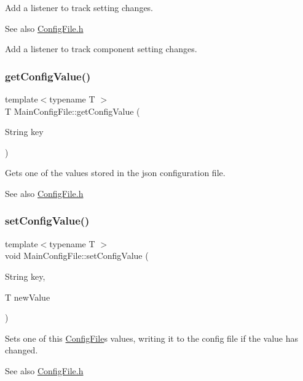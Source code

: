 Add a listener to track setting changes. \begin{DoxySeeAlso}{See also}
\mbox{\hyperlink{ConfigFile_8h}{Config\+File.\+h}}
\end{DoxySeeAlso}
Add a listener to track component setting changes. \mbox{\label{classMainConfigFile_ab856604112ebd4364fba1a2bbe3755ed}} 
\subsubsection{\texorpdfstring{get\+Config\+Value()}{getConfigValue()}}
{\footnotesize\ttfamily template$<$typename T $>$ \\
T Main\+Config\+File\+::get\+Config\+Value (\begin{DoxyParamCaption}\item[{String}]{key }\end{DoxyParamCaption})\hspace{0.3cm}{\ttfamily [inline]}}

Gets one of the values stored in the json configuration file. \begin{DoxySeeAlso}{See also}
\mbox{\hyperlink{ConfigFile_8h}{Config\+File.\+h}} 
\end{DoxySeeAlso}
\mbox{\label{classMainConfigFile_a17371ce4c90e5e4ae04a5adbeae6428e}} 
\subsubsection{\texorpdfstring{set\+Config\+Value()}{setConfigValue()}}
{\footnotesize\ttfamily template$<$typename T $>$ \\
void Main\+Config\+File\+::set\+Config\+Value (\begin{DoxyParamCaption}\item[{String}]{key,  }\item[{T}]{new\+Value }\end{DoxyParamCaption})\hspace{0.3cm}{\ttfamily [inline]}}

Sets one of this \mbox{\hyperlink{classConfigFile}{Config\+File}}\textquotesingle{}s values, writing it to the config file if the value has changed. ~\newline
\begin{DoxySeeAlso}{See also}
\mbox{\hyperlink{ConfigFile_8h}{Config\+File.\+h}} 
\end{DoxySeeAlso}


